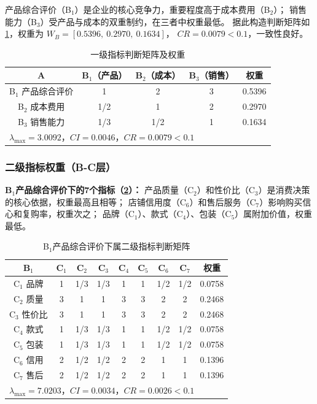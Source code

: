 \documentclass[a4paper,12pt]{ctexart}
\begin{document}
产品综合评价（B$_1$）是企业的核心竞争力，重要程度高于成本费用（B$_2$）；
销售能力（B$_3$）受产品与成本的双重制约，在三者中权重最低。
据此构造判断矩阵如\cref{tab:ab}，权重为
$W_B = [0.5396,\ 0.2970,\ 0.1634]$，
$CR = 0.0079 < 0.1$，一致性良好。

\begin{table}[H]
\centering
\caption{一级指标判断矩阵及权重}
\label{tab:ab}
\begin{tabular}{c|ccc|c}
\toprule
A & B$_1$（产品） & B$_2$（成本） & B$_3$（销售） & 权重 \\
\midrule
B$_1$ 产品综合评价 & 1   & 2   & 3   & 0.5396 \\
B$_2$ 成本费用     & 1/2 & 1   & 2   & 0.2970 \\
B$_3$ 销售能力     & 1/3 & 1/2 & 1   & 0.1634 \\
\bottomrule
\multicolumn{5}{l}{$\lambda_{\max}=3.0092$，$CI=0.0046$，$CR=0.0079<0.1$} \\
\end{tabular}
\end{table}

\subsubsection{二级指标权重（B-C层）}

\textbf{B$_1$产品综合评价下的7个指标（\cref{tab:b1c}）：}
产品质量（C$_2$）和性价比（C$_3$）是消费决策的核心依据，权重最高且相等；
店铺信用度（C$_6$）和售后服务（C$_7$）影响购买信心和复购率，权重次之；
品牌（C$_1$）、款式（C$_4$）、包装（C$_5$）属附加价值，权重最低。

\begin{table}[H]
\centering
\caption{B$_1$产品综合评价下属二级指标判断矩阵}
\label{tab:b1c}
\small
\begin{tabular}{c|ccccccc|c}
\toprule
B$_1$ & C$_1$ & C$_2$ & C$_3$ & C$_4$ & C$_5$ & C$_6$ & C$_7$ & 权重 \\
\midrule
C$_1$ 品牌   & 1 & 1/3 & 1/3 & 1   & 1   & 1/2 & 1/2 & 0.0758 \\
C$_2$ 质量   & 3 & 1   & 1   & 3   & 3   & 2   & 2   & 0.2468 \\
C$_3$ 性价比 & 3 & 1   & 1   & 3   & 3   & 2   & 2   & 0.2468 \\
C$_4$ 款式   & 1 & 1/3 & 1/3 & 1   & 1   & 1/2 & 1/2 & 0.0758 \\
C$_5$ 包装   & 1 & 1/3 & 1/3 & 1   & 1   & 1/2 & 1/2 & 0.0758 \\
C$_6$ 信用   & 2 & 1/2 & 1/2 & 2   & 2   & 1   & 1   & 0.1396 \\
C$_7$ 售后   & 2 & 1/2 & 1/2 & 2   & 2   & 1   & 1   & 0.1396 \\
\bottomrule
\multicolumn{9}{l}{$\lambda_{\max}=7.0203$，$CI=0.0034$，$CR=0.0026<0.1$} \\
\end{tabular}
\end{table}
\end{document}
